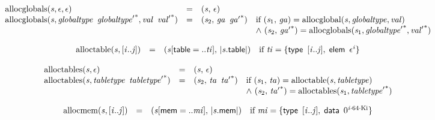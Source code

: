 $$
\begin{array}{@{}lcl@{}l@{}}
{\mathrm{allocglobals}}({\mathit{s}}, \epsilon, \epsilon) &=& ({\mathit{s}},\, \epsilon) &  \\
{\mathrm{allocglobals}}({\mathit{s}}, {\mathit{globaltype}}~\,{{\mathit{globaltype}'}^\ast}, {\mathit{val}}~\,{{\mathit{val}'}^\ast}) &=& ({\mathit{s}}_{{2}},\, {\mathit{ga}}~\,{{\mathit{ga}'}^\ast}) &\quad
  \mbox{if}~({\mathit{s}}_{{1}},\, {\mathit{ga}}) = {\mathrm{allocglobal}}({\mathit{s}}, {\mathit{globaltype}}, {\mathit{val}}) \\
 &&&\quad {\land}~({\mathit{s}}_{{2}},\, {{\mathit{ga}'}^\ast}) = {\mathrm{allocglobals}}({\mathit{s}}_{{1}}, {{\mathit{globaltype}'}^\ast}, {{\mathit{val}'}^\ast}) \\
\end{array}
$$

$$
\begin{array}{@{}lcl@{}l@{}}
{\mathrm{alloctable}}({\mathit{s}}, {}[{\mathit{i}} .. {\mathit{j}}]) &=& ({\mathit{s}}{}[\mathsf{table} = ..{\mathit{ti}}],\, {|{\mathit{s}}.\mathsf{table}|}) &\quad
  \mbox{if}~{\mathit{ti}} = \{ \begin{array}[t]{@{}l@{}}
\mathsf{type}~\,{}[{\mathit{i}} .. {\mathit{j}}],\; \mathsf{elem}~\,{\epsilon^{{\mathit{i}}}} \}\end{array} \\
\end{array}
$$

$$
\begin{array}{@{}lcl@{}l@{}}
{\mathrm{alloctables}}({\mathit{s}}, \epsilon) &=& ({\mathit{s}},\, \epsilon) &  \\
{\mathrm{alloctables}}({\mathit{s}}, {\mathit{tabletype}}~\,{{\mathit{tabletype}'}^\ast}) &=& ({\mathit{s}}_{{2}},\, {\mathit{ta}}~\,{{\mathit{ta}'}^\ast}) &\quad
  \mbox{if}~({\mathit{s}}_{{1}},\, {\mathit{ta}}) = {\mathrm{alloctable}}({\mathit{s}}, {\mathit{tabletype}}) \\
 &&&\quad {\land}~({\mathit{s}}_{{2}},\, {{\mathit{ta}'}^\ast}) = {\mathrm{alloctables}}({\mathit{s}}_{{1}}, {{\mathit{tabletype}'}^\ast}) \\
\end{array}
$$

$$
\begin{array}{@{}lcl@{}l@{}}
{\mathrm{allocmem}}({\mathit{s}}, {}[{\mathit{i}} .. {\mathit{j}}]) &=& ({\mathit{s}}{}[\mathsf{mem} = ..{\mathit{mi}}],\, {|{\mathit{s}}.\mathsf{mem}|}) &\quad
  \mbox{if}~{\mathit{mi}} = \{ \begin{array}[t]{@{}l@{}}
\mathsf{type}~\,{}[{\mathit{i}} .. {\mathit{j}}],\; \mathsf{data}~\,{0^{{\mathit{i}} \cdot 64 \cdot {\mathrm{Ki}}}} \}\end{array} \\
\end{array}
$$


